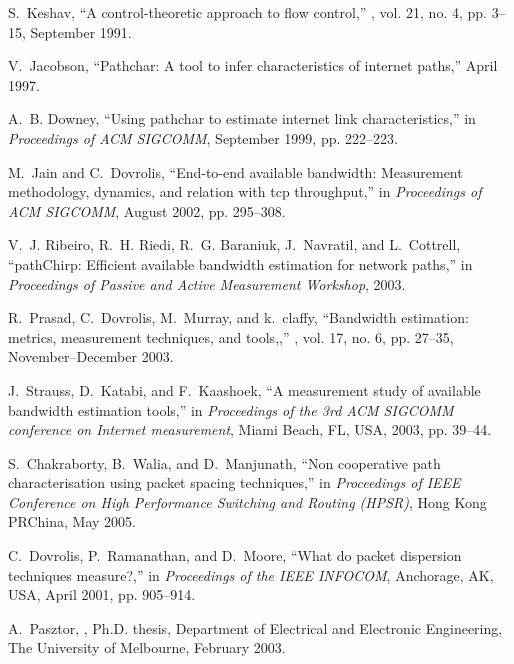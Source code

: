 \documentclass[11pt]{article}
\begin{document}
\begin{thebibliography}{10}
S.~Keshav,
\newblock ``A control-theoretic approach to flow control,''
, vol. 21, no. 4, pp.
  3--15, September 1991.

V.~Jacobson,
\newblock ``Pathchar: A tool to infer characteristics of internet paths,''
  April 1997.

A.~B. Downey,
\newblock ``Using {pathchar} to estimate internet link characteristics,''
\newblock in {\em Proceedings of ACM SIGCOMM}, September 1999, pp. 222--223.

M.~Jain and C.~Dovrolis,
\newblock ``End-to-end available bandwidth: Measurement methodology, dynamics,
  and relation with tcp throughput,''
\newblock in {\em Proceedings of ACM SIGCOMM}, August 2002, pp. 295--308.

V.~J. Ribeiro, R.~H. Riedi, R.~G. Baraniuk, J.~Navratil, and L.~Cottrell,
\newblock ``{pathChirp}: Efficient available bandwidth estimation for network
  paths,''
\newblock in {\em Proceedings of Passive and Active Measurement Workshop},
  2003.

R.~Prasad, C.~Dovrolis, M.~Murray, and {k.~claffy},
\newblock ``Bandwidth estimation: metrics, measurement techniques, and
  tools,,''
, vol. 17, no. 6, pp. 27--35, November--December
  2003.

J.~Strauss, D.~Katabi, and F.~Kaashoek,
\newblock ``A measurement study of available bandwidth estimation tools,''
\newblock in {\em Proceedings of the 3rd ACM SIGCOMM conference on Internet
  measurement}, Miami Beach, FL, USA, 2003, pp. 39--44.

S.~Chakraborty, B.~Walia, and D.~Manjunath,
\newblock ``Non cooperative path characterisation using packet spacing
  techniques,''
\newblock in {\em Proceedings of IEEE Conference on High Performance Switching
  and Routing (HPSR)}, Hong Kong PRChina, May 2005.

C.~Dovrolis, P.~Ramanathan, and D.~Moore,
\newblock ``What do packet dispersion techniques measure?,''
\newblock in {\em Proceedings of the IEEE INFOCOM}, Anchorage, AK, USA, April
  2001, pp. 905--914.

A.~Pasztor,
,
\newblock Ph.D. thesis, Department of Electrical and Electronic Engineering,
  The University of Melbourne, February 2003.


\end{thebibliography}
\end{document}
